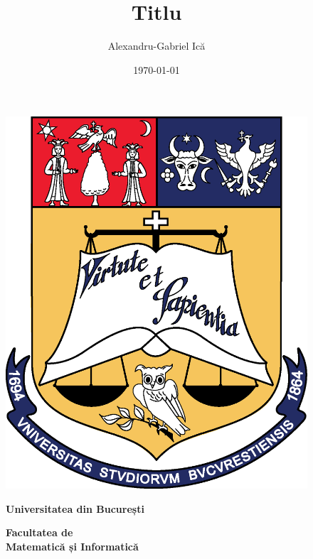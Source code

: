 \documentclass[a4paper, 12pt]{report}
\title{Titlu}
\author{Alexandru-Gabriel Ică}
\date{\today}
\begin{document}
\begin{titlepage}
    \begin{figure}[!htb]
    \centering
    \begin{minipage}{0.19\textwidth}
        \includegraphics[width=\linewidth]{img/UB_Logo.png}
    \end{minipage}
    \begin{minipage}{0.57\textwidth}
        \large
        \vspace{0.2cm}
        \begin{center}
            \textbf{Universitatea din București}
        \end{center}
        \vspace{0.3cm}
        \begin{center}
            \textbf{
                Facultatea de \\
                Matematică și Informatică
            }
        \end{center}
    \end{minipage}
    \begin{minipage}{0.21\textwidth}

\end{minipage}
\end{figure}
\end{titlepage}
\end{document}
